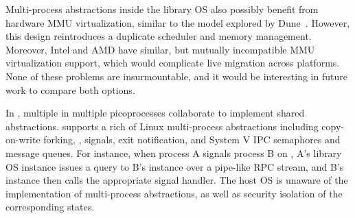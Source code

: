Multi-process abstractions
inside the library OS also possibly benefit from
hardware MMU virtualization, similar to
the model explored by Dune~\cite{belay12dune}.
However, this design reintroduces a duplicate scheduler and memory management.
Moreover, Intel and AMD have similar, but mutually incompatible MMU virtualization support,
which would complicate live migration across platforms.
None of these problems are insurmountable, and it would be interesting in future
work to compare both options.


In \graphene{}, multiple \liboses{} in multiple picoprocesses collaborate to implement shared abstractions. \graphene{} supports a rich of Linux multi-process abstractions including copy-on-write forking, , signals, exit notification, and System V IPC semaphores and message queues.
For instance, when process A signals process B on \graphene{}, A's library OS instance issues a query to B's instance over a pipe-like
RPC stream, and B's instance then calls the appropriate signal handler.
The host OS is unaware of the implementation
of multi-process abstractions,
as well as security isolation of the corresponding states.





